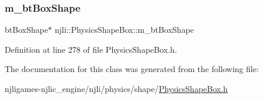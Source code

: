 \subsubsection{\texorpdfstring{m\+\_\+bt\+Box\+Shape}{m\_btBoxShape}}
{\footnotesize\ttfamily bt\+Box\+Shape$\ast$ njli\+::\+Physics\+Shape\+Box\+::m\+\_\+bt\+Box\+Shape\hspace{0.3cm}{\ttfamily [private]}}



Definition at line 278 of file Physics\+Shape\+Box.\+h.



The documentation for this class was generated from the following file\+:\begin{DoxyCompactItemize}
\item 
njligames-\/njlic\+\_\+engine/njli/physics/shape/\mbox{\hyperlink{_physics_shape_box_8h}{Physics\+Shape\+Box.\+h}}\end{DoxyCompactItemize}

